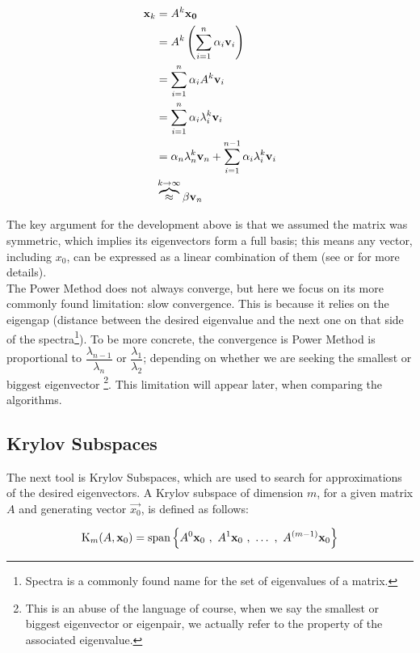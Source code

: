 \begin{align*}
  \vec{x}_k &= A^{k}\vec{x_0} \\
  &= A^{k}\left(\sum\limits_{\tiny{i=1}}^{n} \alpha_i\vec{v}_i \right) \\
  &= \sum\limits_{\tiny{i=1}}^{n} \alpha_i A^{k} \vec{v}_i  \\
  &= \sum\limits_{\tiny{i=1}}^{n} \alpha_i \lambda_i^{k} \vec{v}_i \\
  &= \alpha_n \lambda_n^{k} \vec{v}_n +
  \sum\limits_{\tiny{i=1}}^{n-1} \alpha_i \lambda_i^{k} \vec{v}_i \\
  & \overbrace{\approx}^{k \to \infty} \beta \vec{v}_n  
\end{align*}

The key argument for the development above is that we assumed the
matrix was symmetric, which implies its eigenvectors form a full
basis; this means any vector, including $x_0$, can be expressed as a
linear combination of them (see \cite{strang88} or \cite{golub13} for
more details). \\

The Power Method does not always converge, but here we focus on its
more commonly found limitation: slow convergence. This is because it
relies on the eigengap (distance between the desired eigenvalue and
the next one on that side of the spectra\footnote{Spectra is a
  commonly found name for the set of eigenvalues of a matrix.}). To be
more concrete, the convergence is Power Method is proportional to
$\dfrac{\lambda_{n-1}}{\lambda_n}$ or $\dfrac{\lambda_1}{\lambda_2}$;
depending on whether we are seeking the smallest or biggest
eigenvector \footnote{This is an abuse of the language of course, when
we say the smallest or biggest eigenvector or eigenpair, we actually refer to
the property of the associated eigenvalue.}. This limitation will appear
later, when comparing the algorithms.

\subsection{Krylov Subspaces}

The next tool is Krylov Subspaces, which are used to search for
approximations of the desired eigenvectors. A Krylov subspace of
dimension $m$, for a given matrix $A$ and generating vector
$\vec{x_0}$, is defined as follows: 

\begin{equation*}
    \Krylov{A}{\vec{x}_0}{m} =
    \func{span}
    \left\{
      A^0\vec{x}_0\ds{,} A^1\vec{x}_0\ds{,} \ldots \ds{,}  A^{(m-1)}\vec{x}_0
      \right\}  
\end{equation*}
\joinbelow{1cm}


